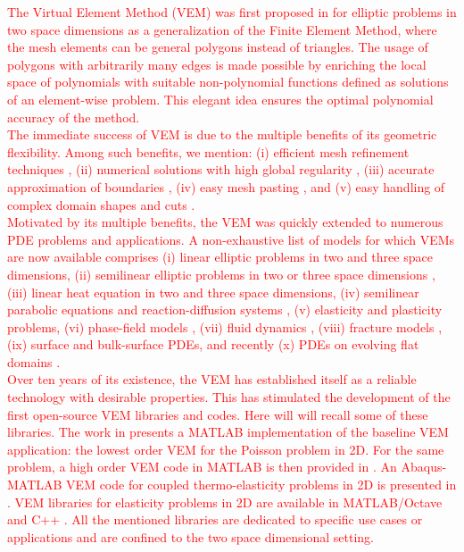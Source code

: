 \documentclass[a4paper]{article}
\newcommand{\red}[1]{\textcolor{red}{#1}}
\begin{document}
\red{The Virtual Element Method (VEM) was first proposed in \cite{beirao2013basic} for elliptic problems in two space dimensions as a generalization of the Finite Element Method, where the mesh elements can be general polygons instead of triangles.  The usage of polygons with arbitrarily many edges is made possible by enriching the local space of polynomials with suitable non-polynomial functions defined as solutions of an element-wise problem.  This elegant idea ensures the optimal polynomial accuracy of the method.\\
The immediate success of VEM is due to the multiple benefits of its geometric flexibility. Among such benefits, we mention: (i) efficient mesh refinement techniques \cite{cangiani2017posteriori, van2022mesh}, (ii) numerical solutions with high global regularity \cite{da2020c1,da2014virtual}, (iii) accurate approximation of boundaries 
\cite{da2019virtual, bertoluzza2019high, dassi2022bend},  (iv) easy mesh pasting \cite{da2018virtual, frittelli2018virtual}, and (v) easy handling of complex domain shapes and cuts \cite{benedetto2014virtual, dassi2022virtual}.\\
Motivated by its multiple benefits, the VEM was quickly extended to numerous PDE problems and applications. A non-exhaustive list of models for which VEMs are now available comprises (i) linear elliptic problems in two \cite{beirao2013basic, da2019virtual} and three \cite{da2017high} space dimensions,  (ii) semilinear elliptic problems in two or three space dimensions \cite{xiao2022nonconforming}, (iii) linear heat equation in two \cite{vacca2015virtual} and three \cite{zhao2019nonconforming} space dimensions, (iv) semilinear parabolic equations \cite{adak2019convergence} and reaction-diffusion systems \cite{huang2021posteriori}, (v) elasticity \cite{da2013virtual, gain2014virtual} and plasticity \cite{aldakheel2019virtual} problems,  (vi) phase-field models \cite{aldakheel2018phase, antonietti2016c}, (vii) fluid dynamics \cite{adak2021virtual, beirao2019stokes},
(viii) fracture models \cite{benedetto2014virtual}, 
(ix) surface \cite{bachini2021arbitrary, frittelli2018virtual} and bulk-surface \cite{frittelli2021bulk,  frittelli2023bsrds, frittelli2023elliptic} PDEs, and recently (x) PDEs on evolving flat domains \cite{wells2022velocitybased}.\\
%
Over ten years of its existence, the VEM has established itself as a reliable technology with desirable properties. This has stimulated the development of the first open-source VEM libraries and codes.  Here will will recall some of these libraries.  The  work in \cite{Sutton_2016} presents a MATLAB implementation of the baseline VEM application: the lowest order VEM for the Poisson problem in 2D. For the same problem, a high order VEM code in MATLAB is then provided in \cite{Herrera_2022}. An Abaqus-MATLAB VEM code for coupled thermo-elasticity problems in 2D is presented in \cite{Dhanush_2018}.  VEM libraries for elasticity problems in 2D are available in MATLAB/Octave \cite{VEMLAB} and C++ \cite{Ortiz_Bernardin_2019}. All the mentioned libraries are dedicated to specific use cases or applications and are confined to the two space dimensional setting. \\
}
\end{document}
